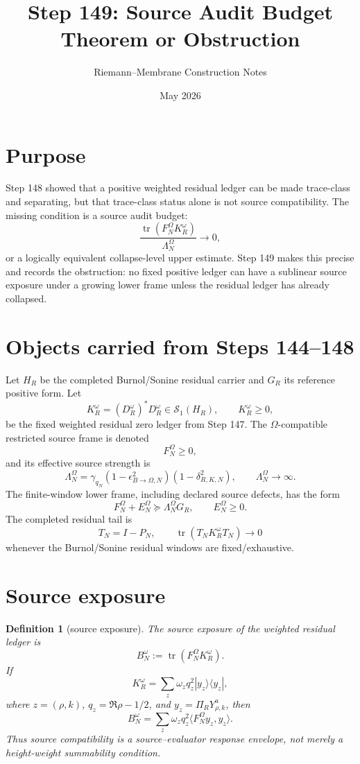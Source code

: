 \documentclass[11pt]{article}
\title{Step 149: Source Audit Budget Theorem or Obstruction}
\author{Riemann--Membrane Construction Notes}
\date{May 2026}
\newtheorem{definition}{Definition}
\newcommand{\tr}{\operatorname{tr}}
\begin{document}
\maketitle

\section{Purpose}
Step 148 showed that a positive weighted residual ledger can be made trace-class and separating, but that trace-class status alone is not source compatibility.  The missing condition is a source audit budget:
\[
  \frac{\tr(F_N^\Omega K_R^\omega)}{\Lambda_N^\Omega}\longrightarrow 0,
\]
or a logically equivalent collapse-level upper estimate.  Step 149 makes this precise and records the obstruction: no fixed positive ledger can have a sublinear source exposure under a growing lower frame unless the residual ledger has already collapsed.

\section{Objects carried from Steps 144--148}
Let \(H_R\) be the completed Burnol/Sonine residual carrier and \(G_R\) its reference positive form.  Let
\[
  K_R^\omega=(D_R^\omega)^*D_R^\omega\in\mathcal S_1(H_R),
  \qquad K_R^\omega\ge 0,
\]
be the fixed weighted residual zero ledger from Step 147.  The \(\Omega\)-compatible restricted source frame is denoted
\[
  F_N^\Omega\ge 0,
\]
and its effective source strength is
\[
  \Lambda_N^\Omega
  = \gamma_{q_N}
    (1-\epsilon_{B\to\Omega,N}^2)
    (1-\delta_{R,K,N}^2),
  \qquad \Lambda_N^\Omega\to\infty.
\]
The finite-window lower frame, including declared source defects, has the form
\begin{equation}\label{eq:lower-frame-defect}
  F_N^\Omega + E_N^\Omega \succeq \Lambda_N^\Omega G_R,
  \qquad E_N^\Omega\ge0.
\end{equation}
The completed residual tail is
\[
  T_N=I-P_N,
  \qquad \tr(T_NK_R^\omega T_N)\to0
\]
whenever the Burnol/Sonine residual windows are fixed/exhaustive.

\section{Source exposure}
\begin{definition}[source exposure]
The source exposure of the weighted residual ledger is
\[
  B_N^\omega:=\tr(F_N^\Omega K_R^\omega).
\]
If
\[
  K_R^\omega=\sum_z \omega_z q_z^2 |y_z\rangle\langle y_z|,
\]
where \(z=(\rho,k)\), \(q_z=\Re\rho-1/2\), and \(y_z=\Pi_RY^a_{\rho,k}\), then
\begin{equation}\label{eq:source-exposure-expanded}
  B_N^\omega
  =\sum_z \omega_zq_z^2\langle F_N^\Omega y_z,y_z\rangle.
\end{equation}
Thus source compatibility is a source--evaluator response envelope, not merely a height-weight summability condition.
\end{definition}
\end{document}
